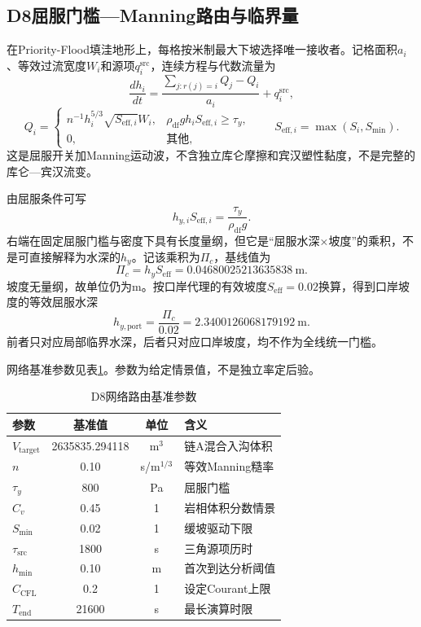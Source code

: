 \subsection{D8屈服门槛—Manning路由与临界量}
在Priority-Flood填洼地形上，每格按米制最大下坡选择唯一接收者\cite{tarboton1997}。记格面积$a_i$、等效过流宽度$W_i$和源项$q_i^{\mathrm{src}}$，连续方程与代数流量为
\begin{equation}
\frac{dh_i}{dt}
=\frac{\sum_{j:r(j)=i}Q_j-Q_i}{a_i}+q_i^{\mathrm{src}},
\end{equation}
\begin{equation}
Q_i=
\begin{cases}
n^{-1}h_i^{5/3}\sqrt{S_{\mathrm{eff},i}}W_i,
&\rho_{\mathrm{df}}gh_iS_{\mathrm{eff},i}\ge\tau_y,\\
0,&\text{其他},
\end{cases}
\qquad
S_{\mathrm{eff},i}=\max(S_i,S_{\min}).
\end{equation}
这是屈服开关加Manning运动波，不含独立库仑摩擦和宾汉塑性黏度，不是完整的库仑—宾汉流变。

由屈服条件可写
\begin{equation}
h_{y,i}S_{\mathrm{eff},i}
=\frac{\tau_y}{\rho_{\mathrm{df}}g}.
\end{equation}
右端在固定屈服门槛与密度下具有长度量纲，但它是“屈服水深×坡度”的乘积，不是可直接解释为水深的$h_{y}$。记该乘积为$\Pi_c$，基线值为
\begin{equation}
\Pi_c=h_{y}S_{\mathrm{eff}}
=0.04680025213635838\ \mathrm{m}.
\end{equation}
坡度无量纲，故单位仍为m。按口岸代理的有效坡度$S_{\mathrm{eff}}=0.02$换算，得到口岸坡度的等效屈服水深
\begin{equation}
h_{y,\mathrm{port}}
=\frac{\Pi_c}{0.02}
=2.3400126068179192\ \mathrm{m}.
\end{equation}
前者只对应局部临界水深，后者只对应口岸坡度，均不作为全线统一门槛。

网络基准参数见表\ref{tab:q4-routing}。参数为给定情景值，不是独立率定后验。

\begin{table}[htbp]\centering\small
\caption{D8网络路由基准参数}\label{tab:q4-routing}
\begin{tabular}{@{}l c c l@{}}
\toprule
参数&基准值&单位&含义\\
\midrule
$V_{\mathrm{target}}$&2635835.294118&m$^3$&链A混合入沟体积\\
$n$&0.10&s/m$^{1/3}$&等效Manning糙率\\
$\tau_y$&800&Pa&屈服门槛\\
$C_v$&0.45&1&岩相体积分数情景\\
$S_{\min}$&0.02&1&缓坡驱动下限\\
$\tau_{\mathrm{src}}$&1800&s&三角源项历时\\
$h_{\min}$&0.10&m&首次到达分析阈值\\
$C_{\mathrm{CFL}}$&0.2&1&设定Courant上限\\
$T_{\mathrm{end}}$&21600&s&最长演算时限\\
\bottomrule
\end{tabular}
\end{table}

